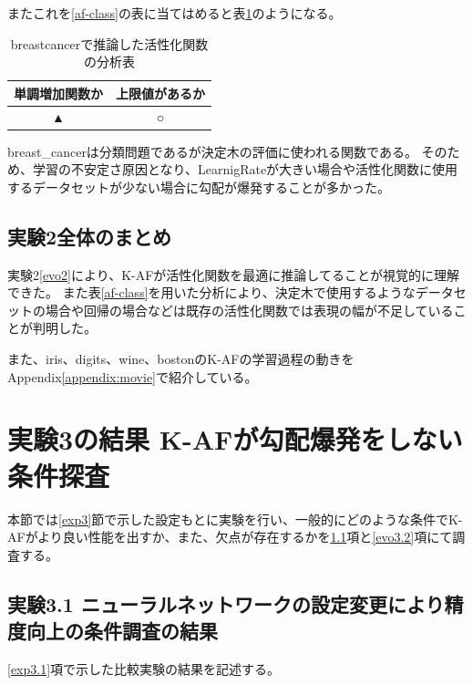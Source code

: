 またこれを\ref{af-class}の表に当てはめると表\ref{anal_breastcancer}のようになる。
\begin{table}[htbp]
    \begin{center}
        \caption{breastcancerで推論した活性化関数の分析表}
        \label{anal_breastcancer}
        \vspace{2mm} 
        \begin{tabular}{ |c|c| }
        \hline
        単調増加関数か  & 上限値があるか   \\
        \hline
        ▲ & ○   \\
        \hline
        \end{tabular}
    \end{center}
\end{table}


breast\_cancerは分類問題であるが決定木の評価に使われる関数である。
そのため、学習の不安定さ原因となり、LearnigRateが大きい場合や活性化関数に使用するデータセットが少ない場合に勾配が爆発することが多かった。




\subsection{実験2全体のまとめ}
実験2\ref{evo2}により、K-AFが活性化関数を最適に推論してることが視覚的に理解できた。
また表\ref{af-class}を用いた分析により、決定木で使用するようなデータセットの場合や回帰の場合などは既存の活性化関数では表現の幅が不足していることが判明した。

また、iris、digits、wine、bostonのK-AFの学習過程の動きをAppendix\ref{appendix:movie}で紹介している。









\section{実験3の結果 K-AFが勾配爆発をしない条件探査}
\label{evo3}

本節では\ref{exp3}節で示した設定もとに実験を行い、一般的にどのような条件でK-AFがより良い性能を出すか、また、欠点が存在するかを\ref{evo3.1}項と\ref{evo3.2}項にて調査する。


\subsection{実験3.1 ニューラルネットワークの設定変更により精度向上の条件調査の結果}
\label{evo3.1}
\ref{exp3.1}項で示した比較実験の結果を記述する。


